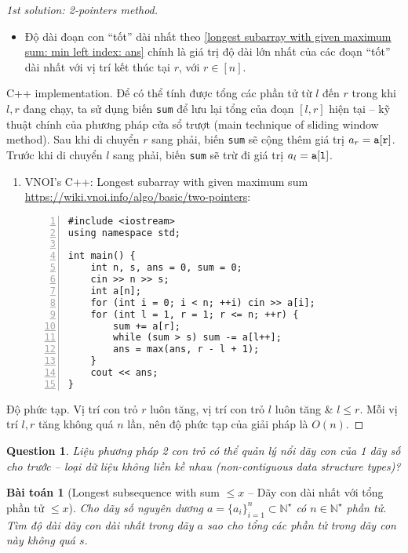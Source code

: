 \documentclass{article}
\newtheorem{baitoan}{Bài toán}
\newtheorem{question}{Question}
\begin{document}
\begin{proof}[1st solution: 2-pointers method]
\begin{itemize}
         \item Độ dài đoạn con ``tốt'' dài nhất theo \eqref{longest subarray with given maximum sum: min left index: ans} chính là giá trị độ dài lớn nhất của các đoạn ``tốt'' dài nhất với vị trí kết thúc tại $r$, với $r\in[n]$.
     \end{itemize}
     \item {\sf C++ implementation.} Để có thể tính được tổng các phần tử từ $l$ đến $r$ trong khi $l,r$ đang chạy, ta sử dụng biến {\tt sum} để lưu lại tổng của đoạn $[l,r]$ hiện tại -- kỹ thuật chính của phương pháp cửa sổ trượt (main technique of sliding window method). Sau khi di chuyển $r$ sang phải, biến {\tt sum} sẽ cộng thêm giá trị $a_r = {\tt a[r]}$. Trước khi di chuyển $l$ sang phải, biến {\tt sum} sẽ trừ đi giá trị $a_l = {\tt a[l]}$.
     \begin{enumerate}
         \item VNOI's C++: Longest subarray with given maximum sum \url{https://wiki.vnoi.info/algo/basic/two-pointers}:
         \begin{Verbatim}[numbers=left,xleftmargin=5mm]
#include <iostream>
using namespace std;

int main() {
    int n, s, ans = 0, sum = 0;
    cin >> n >> s;
    int a[n];
    for (int i = 0; i < n; ++i) cin >> a[i];
    for (int l = 1, r = 1; r <= n; ++r) {
        sum += a[r];
        while (sum > s) sum -= a[l++];
        ans = max(ans, r - l + 1);
    }
    cout << ans;
}
         \end{Verbatim}
     \end{enumerate}
    \item {\sf Độ phức tạp.} Vị trí con trỏ $r$ luôn tăng, vị trí con trỏ $l$ luôn tăng \& $l\le r$. Mỗi vị trí $l,r$ tăng không quá $n$ lần, nên độ phức tạp của giải pháp là $O(n)$.
\end{proof}

\begin{question}
    Liệu phương pháp 2 con trỏ có thể quản lý nổi dãy con của 1 dãy số cho trước -- loại dữ liệu không liền kề nhau (non-contiguous data structure types)?
\end{question}

\begin{baitoan}[Longest subsequence with sum $\le x$ -- Dãy con dài nhất với tổng phần tử $\le x$]
    Cho dãy số nguyên dương $a = \{a_i\}_{i=1}^n\subset\mathbb{N}^\star$ có $n\in\mathbb{N}^\star$ phần tử. Tìm độ dài dãy con dài nhất trong dãy $a$ sao cho tổng các phần tử trong dãy con này không quá $s$.
\end{baitoan}
\end{document}
